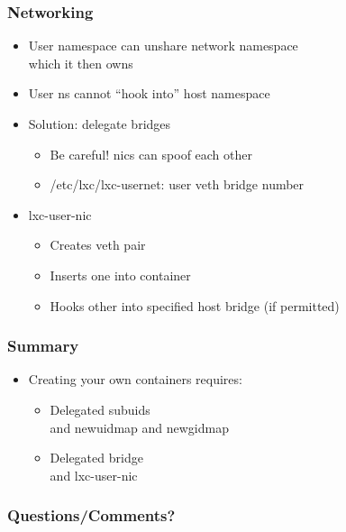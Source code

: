 \documentclass{beamer}
\begin{document}
\begin{frame}
\frametitle{Networking}
	\begin{itemize}
	\item User namespace can unshare network namespace \\
		which it then owns
	\item User ns cannot ``hook into'' host namespace
	\item Solution: delegate bridges
		\begin{itemize}
		\item Be careful! nics can spoof each other
		\item /etc/lxc/lxc-usernet: user veth bridge number
		\end{itemize}
	\item lxc-user-nic
		\begin{itemize}
		\item Creates veth pair
		\item Inserts one into container
		\item Hooks other into specified host bridge (if permitted)
		\end{itemize}
	\end{itemize}
\end{frame}

\begin{frame}
\frametitle{Summary}
	\begin{itemize}
	\item Creating your own containers requires:
		\begin{itemize}
		\item Delegated subuids \\
		{\tiny and newuidmap and newgidmap}
		\item Delegated bridge \\
		{\tiny and lxc-user-nic}
		\end{itemize}
	\end{itemize}
\end{frame}


\begin{frame}
\frametitle{Questions/Comments?}
\end{frame}

\end{document}
